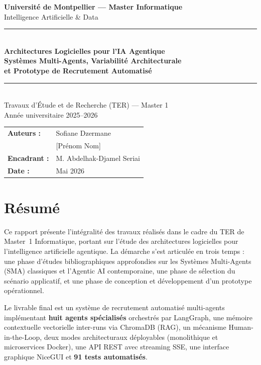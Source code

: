 \documentclass[12pt,a4paper]{report}
\begin{document}
\begin{titlepage}
\begin{center}
\vspace*{1.5cm}
{\Large\bfseries Université de Montpellier --- Master Informatique}\\[0.4em]
{\large Intelligence Artificielle \& Data}\\[0.8em]
\rule{\textwidth}{1.5pt}\\[1.5em]
{\LARGE\bfseries\color{primary}
Architectures Logicielles pour l'IA Agentique\\[0.5em]}
{\large\bfseries
Systèmes Multi-Agents, Variabilité Architecturale\\
et Prototype de Recrutement Automatisé}\\[0.8em]
\rule{\textwidth}{1.5pt}\\[1.5em]
{\large Travaux d'Étude et de Recherche (TER) --- Master 1}\\[0.4em]
{\large Année universitaire 2025--2026}\\[2cm]
\begin{tabular}{ll}
\textbf{Auteurs :} & Sofiane Dzermane\\
& [Prénom Nom]\\[1em]
\textbf{Encadrant :} & M. Abdelhak-Djamel Seriai\\[1em]
\textbf{Date :} & Mai 2026\\
\end{tabular}
\end{center}
\end{titlepage}

\chapter*{Résumé}

Ce rapport présente l'intégralité des travaux réalisés dans le cadre du TER de
Master~1 Informatique, portant sur l'étude des architectures logicielles pour
l'intelligence artificielle agentique. La démarche s'est articulée en trois temps :
une phase d'études bibliographiques approfondies sur les Systèmes Multi-Agents (SMA)
classiques et l'Agentic AI contemporaine, une phase de sélection du scénario applicatif,
et une phase de conception et développement d'un prototype opérationnel.

Le livrable final est un système de recrutement automatisé multi-agents implémentant
\textbf{huit agents spécialisés} orchestrés par LangGraph, une mémoire contextuelle
vectorielle inter-runs via ChromaDB (RAG), un mécanisme Human-in-the-Loop, deux modes
architecturaux déployables (monolithique et microservices Docker), une API REST avec
streaming SSE, une interface graphique NiceGUI et \textbf{91 tests automatisés}.
\end{document}
